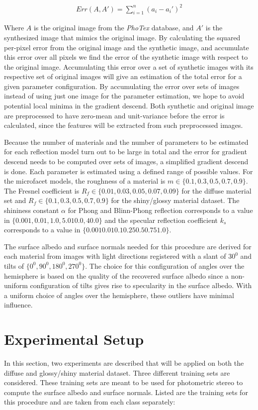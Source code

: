 		\begin{eqnarray*}
			Err(A,A') = \sum_{i=1}^n (a_i - a_i')^2
		\end{eqnarray*}
 
Where $A$ is the original image from the {\it PhoTex} database, and $A'$ is the synthesized image that mimics the original image. By calculating the squared per-pixel error from the original image and the synthetic image, and accumulate this error over all pixels we find the error of the synthetic image with respect to the original image. Accumulating this error over a set of synthetic images with its respective set of original images will give an estimation of the total error for a given parameter configuration. By accumulating the error over sets of images instead of using just one image for the parameter estimation, we hope to avoid potential local minima in the gradient descend. Both synthetic and original image are preprocessed to have zero-mean and unit-variance before the error is calculated, since the features will be extracted from such preprocessed images.

Because the number of materials and the number of parameters to be estimated for each reflection model turn out to be large in total and the error for gradient descend needs to be computed over sets of images, a simplified gradient descend is done. Each parameter is estimated using a defined range of possible values. For the microfacet models, the roughness of a material is $m \in \{0.1, 0.3, 0.5, 0.7, 0.9\}$. The Fresnel coefficient is $R_f \in \{0.01, 0.03, 0.05, 0.07, 0.09\}$ for the diffuse material set and $R_f \in \{0.1, 0.3, 0.5, 0.7, 0.9\}$ for the shiny/glossy material dataset. The shininess constant $\alpha$ for Phong and Blinn-Phong reflection corresponds to a value in $\{0.001, 0.01, 1.0, 5.0 10.0, 40.0\}$ and the specular reflection coefficient $k_s$ corresponds to a value in $\{0.001 0.01 0.1 0.25 0.5 0.75 1.0\}$. 

The surface albedo and surface normals needed for this procedure are derived for each material from images with light directions registered with a slant of $30^0$ and tilts of $\{0^0, 90^0, 180^0, 270^0\}$. The choice for this configuration of angles over the hemisphere is based on the quality of the recovered surface albedo since a non-uniform configuration of tilts gives rise to specularity in the surface albedo. With a uniform choice of angles over the hemisphere, these outliers have minimal influence.

\section{Experimental Setup}\label{sec:Experiments}
In this section, two experiments are described that will be applied on both the diffuse and glossy/shiny material dataset. Three different training sets are considered. These training sets are meant to be used for photometric stereo to compute the surface albedo and surface normals. Listed are the training sets for this procedure and are taken from each class separately:

